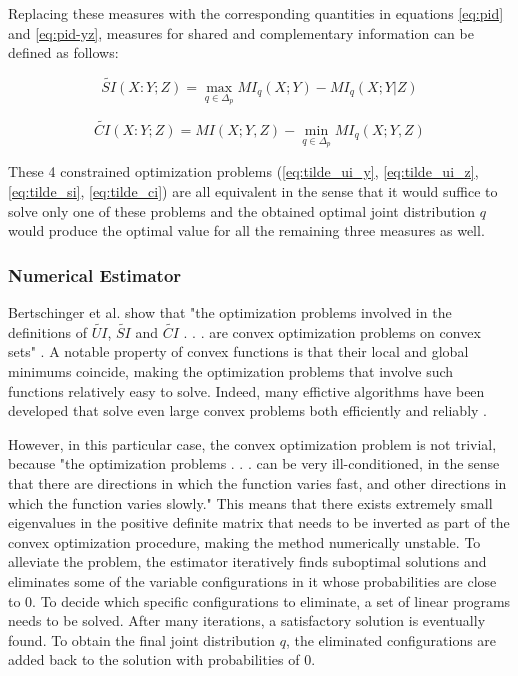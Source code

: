 \documentclass[12pt]{article}
\begin{document}
Replacing these measures with the corresponding quantities in equations \ref{eq:pid} and \ref{eq:pid-yz}, measures for shared and complementary information can be defined as follows: 

\begin{equation}
\widetilde{SI}(X:Y;Z) = \max_{q \in \Delta_p} MI_q (X;Y) - MI_q(X;Y|Z)
\label{eq:tilde_si}
\end{equation}

\begin{equation}
\widetilde{CI}(X:Y;Z) = MI(X;Y,Z) - \min_{q \in \Delta_p} MI_q(X;Y,Z)
\label{eq:tilde_ci}
\end{equation}

These 4 constrained optimization problems (\ref{eq:tilde_ui_y}, \ref{eq:tilde_ui_z}, \ref{eq:tilde_si}, \ref{eq:tilde_ci}) are all equivalent in the sense that it would suffice to solve only one of these problems and the obtained optimal joint distribution $q$ would produce the optimal value for all the remaining three measures as well. 

\subsubsection{Numerical Estimator}

Bertschinger et al. show that "the optimization problems involved in the definitions of $\widetilde{UI}$, $\widetilde{SI}$ and $\widetilde{CI}$ . . . are convex optimization problems on convex sets" \cite{bertschinger}. A notable property of convex functions is that their local and global minimums coincide, making the optimization problems that involve such functions relatively easy to solve. Indeed, many effictive  algorithms have been developed that solve even large convex problems both efficiently and reliably \cite{boyd}. 

However, in this particular case, the convex optimization problem is not trivial, because "the optimization problems . . . can be very ill-conditioned, in the sense that there are directions in which the function varies fast, and other directions in which the function varies slowly." \cite{bertschinger} This means that there exists extremely small eigenvalues in the positive definite matrix that needs to be inverted as part of the convex optimization procedure, making the method numerically unstable. To alleviate the problem, the estimator iteratively finds suboptimal solutions and eliminates some of the variable configurations in it whose probabilities are close to 0. To decide which specific configurations to eliminate, a set of linear programs needs to be solved. After many iterations, a satisfactory solution is eventually found. To obtain the final joint distribution $q$, the eliminated configurations are added back to the solution with probabilities of 0. 
\end{document}
